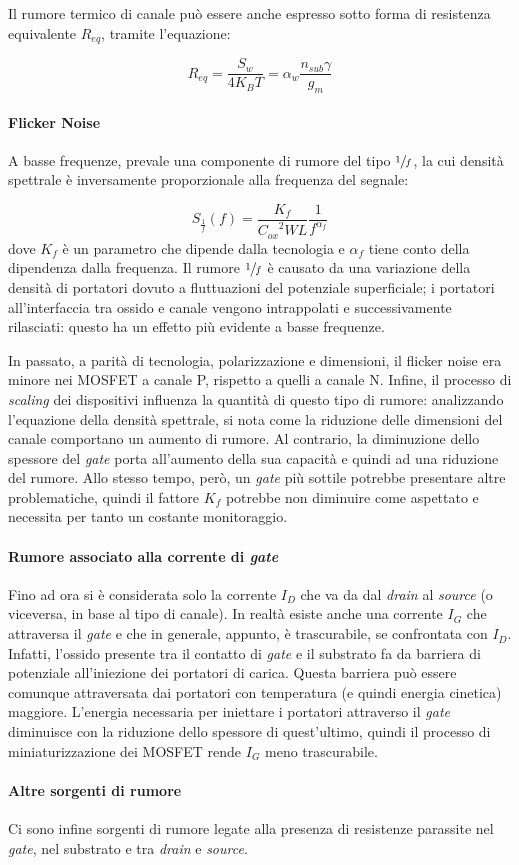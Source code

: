 Il rumore termico di canale può essere anche espresso sotto forma di resistenza equivalente $R_{eq}$, tramite l'equazione:

\begin{equation}
  R_{eq} = \frac{S_w}{4 K_B T} = \alpha_w \frac{n_{sub} \gamma}{g_m}
\end{equation}

\paragraph*{Flicker Noise}
A basse frequenze, prevale una componente di rumore del tipo $\sfrac{1}{f}$, la cui densità spettrale è inversamente proporzionale alla frequenza del segnale:

\begin{equation}
  S_{\frac{1}{f}} \left(f\right) = \frac{K_f}{{C_{ox}}^2 W L} \frac{1}{f^{\alpha_f}}
\end{equation}
dove $K_f$ è un parametro che dipende dalla tecnologia e $\alpha_f$ tiene conto della dipendenza dalla frequenza.
Il rumore $\sfrac{1}{f}$ è causato da una variazione della densità di portatori dovuto a fluttuazioni del potenziale superficiale; i portatori all'interfaccia tra ossido e canale vengono intrappolati e successivamente rilasciati: questo ha un effetto più evidente a basse frequenze.

In passato, a parità di tecnologia, polarizzazione e dimensioni, il flicker noise era minore nei MOSFET a canale P, rispetto a quelli a canale N. Infine, il processo di \emph{scaling} dei dispositivi influenza la quantità di questo tipo di rumore: analizzando l'equazione della densità spettrale, si nota come la riduzione delle dimensioni del canale comportano un aumento di rumore. Al contrario, la diminuzione dello spessore del \emph{gate} porta all'aumento della sua capacità e quindi ad una riduzione del rumore. Allo stesso tempo, però, un \emph{gate} più sottile potrebbe presentare altre problematiche, quindi il fattore $K_f$ potrebbe non diminuire come aspettato e necessita per tanto un costante monitoraggio. 

\paragraph*{Rumore associato alla corrente di \textit{gate}}
Fino ad ora si è considerata solo la corrente $I_D$ che va da dal \emph{drain} al \emph{source} (o viceversa, in base al tipo di canale). In realtà esiste anche una corrente $I_G$ che attraversa il \emph{gate} e che in generale, appunto, è trascurabile, se confrontata con  $I_D$. Infatti, l'ossido presente tra il contatto di \emph{gate} e il substrato fa da barriera di potenziale all'iniezione dei portatori di carica. Questa barriera può essere comunque attraversata dai portatori con temperatura (e quindi energia cinetica) maggiore. L'energia necessaria per iniettare i portatori attraverso il \emph{gate} diminuisce con la riduzione dello spessore di quest'ultimo, quindi il processo di miniaturizzazione dei MOSFET rende $I_G$ meno trascurabile.

\paragraph*{Altre sorgenti di rumore}
Ci sono infine sorgenti di rumore legate alla presenza di resistenze parassite nel \emph{gate}, nel substrato e tra \emph{drain} e \emph{source}.